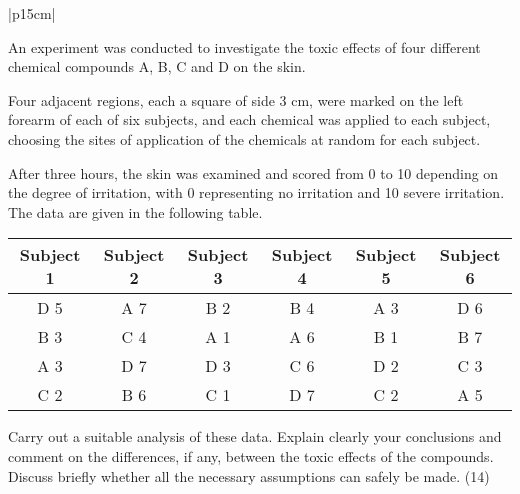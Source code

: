 \documentclass[a4paper,12pt]{article}
\begin{document}
\begin{table}[ht!]
 
\centering
 
\begin{tabular}{|p{15cm}|}
 
\hline  

 An experiment was conducted to investigate the toxic effects of four different chemical compounds A, B, C and D on the skin.  

Four adjacent regions, each a square of side 3 cm, were marked on the left forearm of each of six subjects, and each chemical was applied to each subject, 
choosing the sites of application of the chemicals at random for each subject.  

After three hours, the skin was examined and scored from 0 to 10 depending on the degree of irritation, with 0 representing no irritation and 10 severe irritation.  
The data are given in the following table. 

\begin{center}
\begin{tabular}{|c|c|c|c|c|c|} \hline
Subject 1 &  Subject 2 &  Subject 3&  Subject 4 &  Subject 5 & Subject 6 \\ \hline

D  5  &  A  7  &  B  2 &  B  4 & A  3 &  D  6  \\ \hline
B  3  & C  4 & A  1 & A  6&  B  1 & B  7 \\ \hline 
A  3  &   D  7 &  D  3 & C  6 &  D  2 &  C  3 \\ \hline
C  2  &  B  6 & C  1  & D  7 & C  2 & A  5  \\ \hline
\end{tabular}
\end{center}
 
Carry out a suitable analysis of these data.  Explain clearly your conclusions and comment on the differences, if any, between the toxic effects of the compounds.  Discuss briefly whether all the necessary assumptions can safely be made. (14) 
 

\\ \hline
  
\end{tabular}

\end{table} 
\end{document}
